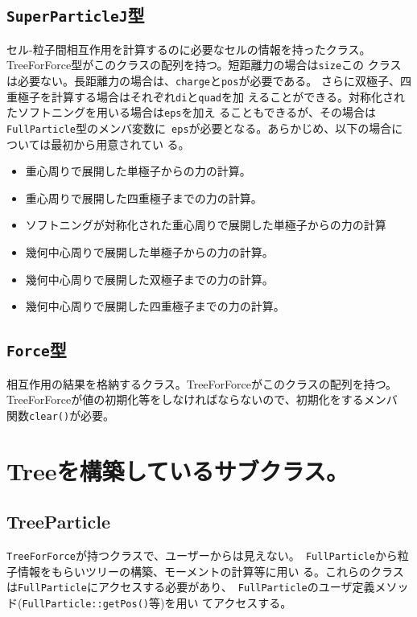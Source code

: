\subsection{{\tt SuperParticleJ}型}

セル-粒子間相互作用を計算するのに必要なセルの情報を持ったクラス。
TreeForForce型がこのクラスの配列を持つ。短距離力の場合は{\tt size}この
クラスは必要ない。長距離力の場合は、{\tt charge}と{\tt pos}が必要である。
さらに双極子、四重極子を計算する場合はそれぞれ{\tt di}と{\tt quad}を加
えることができる。対称化されたソフトニングを用いる場合は{\tt eps}を加え
ることもできるが、その場合は{\tt FullParticle}型のメンバ変数に{\tt
eps}が必要となる。あらかじめ、以下の場合については最初から用意されてい
る。

\begin{itemize}
\item 重心周りで展開した単極子からの力の計算。
\item 重心周りで展開した四重極子までの力の計算。
\item ソフトニングが対称化された重心周りで展開した単極子からの力の計算
\item 幾何中心周りで展開した単極子からの力の計算。
\item 幾何中心周りで展開した双極子までの力の計算。
\item 幾何中心周りで展開した四重極子までの力の計算。
\end{itemize}

\subsection{{\tt Force}型}

相互作用の結果を格納するクラス。TreeForForceがこのクラスの配列を持つ。
TreeForForceが値の初期化等をしなければならないので、初期化をするメンバ
関数{\tt clear()}が必要。

\section{Treeを構築しているサブクラス。}
\label{sec:tree_subclass}

\subsection{TreeParticle}

{\tt TreeForForce}が持つクラスで、ユーザーからは見えない。{\tt
FullParticle}から粒子情報をもらいツリーの構築、モーメントの計算等に用い
る。これらのクラスは{\tt FullParticle}にアクセスする必要があり、{\tt
FullParticle}のユーザ定義メソッド({\tt FullParticle::getPos()}等)を用い
てアクセスする。


